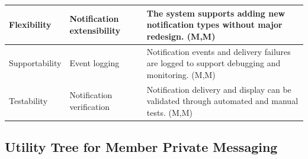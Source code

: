 \documentclass{article}
\begin{document}
\begin{table}[H]
\begin{tabular}{|p{3cm}|p{4cm}|p{7cm}|}
Flexibility
& Notification extensibility
& The system supports adding new notification types without major redesign. (M,M) \\
\hline

Supportability
& Event logging
& Notification events and delivery failures are logged to support debugging and monitoring. (M,M) \\
\hline

Testability
& Notification verification
& Notification delivery and display can be validated through automated and manual tests. (M,M) \\
\hline

\end{tabular}
\end{table}

\subsection{Utility Tree for Member Private Messaging}
\end{document}

